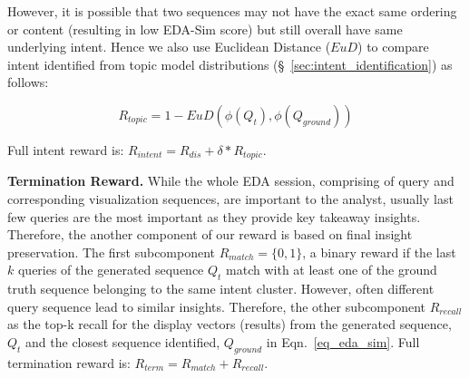 However, it is possible that two sequences may not have the exact same ordering or content (resulting in low EDA-Sim score) but still overall have same underlying intent. 
Hence we also use Euclidean Distance ($EuD$) to compare intent identified from topic model distributions (\S~\ref{sec:intent_identification}) as follows:


{\small
\begin{equation}
\label{topic_reward}
    R_{topic} = 1 - EuD(\phi(Q_t), \phi(Q_{ground}))
\end{equation}
}

Full intent reward is: $R_{intent} = R_{dis} + \delta*R_{topic}$.

\noindent\textbf{Termination Reward. }
While the whole EDA session, comprising of query and corresponding visualization sequences, are important to the analyst, usually last few queries are the most important as they provide key takeaway insights. 
%
%
Therefore, the another component of our reward is based on final insight preservation. The first subcomponent $R_{match} = \{0, 1\}$, a binary 
reward if the last $k$ queries of the generated sequence $Q_t$ match with at least one of the ground truth sequence belonging to the same intent cluster.
%
However, often different query sequence lead to similar insights. Therefore, the other subcomponent  $R_{recall}$ as the top-k recall for the display vectors (results) from the generated sequence, $Q_t$ and the closest sequence identified, $Q_{ground}$ in Eqn.~\ref{eq_eda_sim}.
Full termination reward is: $R_{term} = R_{match} + R_{recall}$.

